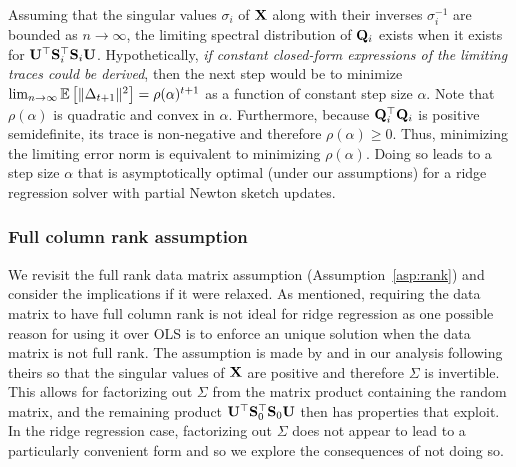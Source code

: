 Assuming that the singular values $\sigma_i$ of $\mathbf{X}$ along with their inverses $\sigma_i^{-1}$ are bounded as $n\rightarrow\infty$, the limiting spectral distribution of $\mathbf{Q}_i$ exists when it exists for $\mathbf{U}^\top\mathbf{S}_i^\top\mathbf{S}_i\mathbf{U}$. Hypothetically, \textit{if constant closed-form expressions of the limiting traces could be derived}, then the next step would be to minimize $\lim_{n\rightarrow\infty}\mathbb{E}\left[\|\Delta_{t+1}\|^2\right] = \rho(\alpha)^{t+1}$ as a function of constant step size $\alpha$. Note that $\rho(\alpha)$ is quadratic and convex in $\alpha$. Furthermore, because $\mathbf{Q}_i^\top\mathbf{Q}_i$ is positive semidefinite, its trace is non-negative and therefore $\rho(\alpha)\geq0$. Thus, minimizing the limiting error norm is equivalent to minimizing $\rho(\alpha)$. Doing so leads to a step size $\alpha$ that is asymptotically optimal (under our assumptions) for a ridge regression solver with partial Newton sketch updates.


\subsubsection{Full column rank assumption} \label{sec:fullrank}

We revisit the full rank data matrix assumption (Assumption~\ref{asp:rank}) and consider the implications if it were relaxed. As mentioned, requiring the data matrix to have full column rank is not ideal for ridge regression as one possible reason for using it over OLS is to enforce an unique solution when the data matrix is not full rank. The assumption is made by \citet{Lacotte:2020} and in our analysis following theirs so that the singular values of $\mathbf{X}$ are positive and therefore $\Sigma$ is invertible. This allows for factorizing out $\Sigma$ from the matrix product containing the random matrix, and the remaining product $\mathbf{U}^\top\mathbf{S}_0^\top\mathbf{S}_0\mathbf{U}$ then has properties that \citet{Lacotte:2020} exploit. In the ridge regression case, factorizing out $\Sigma$ does not appear to lead to a particularly convenient form and so we explore the consequences of not doing so.
\\

